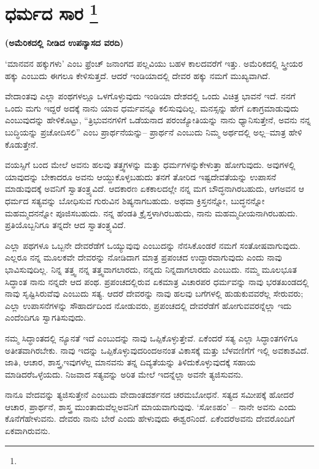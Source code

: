 
\vspace{-0.8cm}

\chapter[ಧರ್ಮದ ಸಾರ ]{ಧರ್ಮದ ಸಾರ \protect\footnote{}}

\centerline{\textbf{(ಅಮೆರಿಕದಲ್ಲಿ ನೀಡಿದ ಉಪನ್ಯಾಸದ ವರದಿ)}}

‘ಮಾನವನ ಹಕ್ಕುಗಳು’ ಎಂಬ ಫ್ರೆಂಚ್​ ಜನಾಂಗದ ಪಲ್ಲವಿಯು ಬಹಳ ಕಾಲದವರೆಗೆ ಇತ್ತು. ಅಮೆರಿಕದಲ್ಲಿ ಸ್ತ್ರೀಯರ ಹಕ್ಕು ಎಂಬುದು ಈಗಲೂ ಕೇಳಿಸುತ್ತದೆ. ಆದರೆ ಇಂಡಿಯಾದಲ್ಲಿ ದೇವರ ಹಕ್ಕು ನಮಗೆ ಮುಖ್ಯವಾಗಿದೆ.

ವೇದಾಂತವು ಎಲ್ಲಾ ಪಂಥಗಳಲ್ಲೂ ಒಳಗೊಳ್ಳುವುದು ಇಂಡಿಯಾ ದೇಶದಲ್ಲಿ ಒಂದು ವಿಚಿತ್ರ ಭಾವನೆ ಇದೆ. ನನಗೆ ಒಂದು ಮಗು ಇದ್ದರೆ ಅದಕ್ಕೆ ನಾನು ಯಾವ ಧರ್ಮವನ್ನೂ ಕಲಿಸುವುದಿಲ್ಲ. ಮನಸ್ಸನ್ನು ಹೇಗೆ ಏಕಾಗ್ರಮಾಡುವುದು ಎಂಬುವುದನ್ನು ಹೇಳಿಕೊಟ್ಟು, “ತ್ರಿಭುವನಗಳಿಗೆ ಒಡೆಯನಾದ ಪರಂಜ್ಯೋತಿಯನ್ನು ನಾನು ಧ್ಯಾನಿಸುತ್ತೇನೆ, ಅವನು ನನ್ನ ಬುದ್ಧಿಯನ್ನು ಪ್ರಚೋದಿಸಲಿ” ಎಂಬ ಪ್ರಾರ್ಥನೆಯನ್ನು– ಪ್ರಾರ್ಥನೆ ಎಂಬುದು ನಿಮ್ಮ ಅರ್ಥದಲ್ಲಿ ಅಲ್ಲ–ಮಾತ್ರ ಹೇಳಿ ಕೊಡುತ್ತೇನೆ.

ವಯಸ್ಸಿಗೆ ಬಂದ ಮೇಲೆ ಅವನು ಹಲವು ತತ್ತ್ವಗಳನ್ನು ಮತ್ತು ಧರ್ಮಗಳನ್ನು\break ಕೇಳುತ್ತಾ ಹೋಗುವುದು. ಅವುಗಳಲ್ಲಿ ಯಾವುದನ್ನು ಬೇಕಾದರೂ ಅವನು ಆಯ್ದುಕೊಳ್ಳ\-ಬಹುದು ತನಗೆ ತೋರಿದ ಇಷ್ಟದೇವತೆಯನ್ನು ಉಪಾಸನೆ ಮಾಡುವುದಕ್ಕೆ ಅವನಿಗೆ ಸ್ವಾತಂತ್ರ್ಯವಿದೆ. ಆದಕಾರಣ ಏಕಕಾಲದಲ್ಲೇ ನನ್ನ ಮಗ ಬೌದ್ಧನಾಗಿರಬಹುದು, ಆಗ\break ಅವನ ಆ ಧರ್ಮದ ಸತ್ಯವನ್ನು ಬೋಧಿಸುವ ಗುರುವಿನ ಶಿಷ್ಯನಾಗಬಹುದು. ಅಥವಾ ಕ್ರಿಸ್ತನನ್ನೋ, ಬುದ್ಧನನ್ನೋ ಮಹಮ್ಮದನನ್ನೋ ಪೂಜಿಸಬಹುದು. ನನ್ನ ಹೆಂಡತಿ ಕ್ರೈಸ್ತಳಾಗಿರ\break ಬಹುದು, ನಾನು ಮಹಮ್ಮದೀಯನಾಗಿರಬಹುದು. ಪ್ರತಿಯೊಬ್ಬನಿಗೂ ತನ್ನದೇ ಆದ ಸ್ವಾತಂತ್ರ್ಯವಿದೆ.

ಎಲ್ಲಾ ಪಥಗಳೂ ಒಬ್ಬನೇ ದೇವರೆಡೆಗೆ ಒಯ್ಯುವುವು ಎಂಬುದನ್ನು ನೆನಸಿಕೊಂಡರೆ ನಮಗೆ ಸಂತೋಷವಾಗುವುದು. ಎಲ್ಲರೂ ನನ್ನ ಮೂಲಕವೇ ದೇವರನ್ನು ನೋಡಿದಾಗ ಮಾತ್ರ ಪ್ರಪಂಚದ ಉದ್ಧಾರವಾಗುವುದು ಎಂದು ನಾವು ಭಾವಿಸುವುದಿಲ್ಲ. ನಿನ್ನ ತತ್ತ್ವ ನನ್ನ ತತ್ತ್ವವಾಗಲಾರದು, ನನ್ನದು ನಿನ್ನದಾಗಲಾರದು ಎಂಬುದು. ನಮ್ಮ ಮೂಲಭೂತ ಸಿದ್ಧಾಂತ ನಾನು ನನ್ನದೇ ಆದ ಪಂಥ. ಪ್ರಪಂಚದಲ್ಲಿರುವ ಏಕಮಾತ್ರ ವಿಚಾರಪರ ಧರ್ಮವನ್ನು ನಾವು ಭರತಖಂಡದಲ್ಲಿ ನಾವು ಸೃಷ್ಟಿಸಿರುವೆವು ಎಂಬುದು ಸತ್ಯ. ಆದರೆ ದೇವರನ್ನು ನಾವು ಹಲವು ಬಗೆಗಳಲ್ಲಿ ಹುಡುಕುವವರೆಲ್ಲ ಸೇರುವರು; ಎಲ್ಲಾ ಉಪಾಸನೆಗಳನ್ನು ಸೌಹಾರ್ದದಿಂದ ನೋಡುವರು, ಪ್ರಪಂಚದಲ್ಲಿ ದೇವರೆಡೆಗೆ ಹೋಗುವವರನ್ನೆಲ್ಲಾ ಇದು ಎಂದೆಂದಿಗೂ ಸ್ವಾಗತಿಸುವುದು.

ನಮ್ಮ ಸಿದ್ಧಾಂತದಲ್ಲಿ ನ್ಯೂನತೆ ಇದೆ ಎಂಬುದನ್ನು ನಾವು ಒಪ್ಪಿಕೊಳ್ಳುತ್ತೇವೆ. ಏಕೆಂದರೆ ಸತ್ಯ ಎಲ್ಲಾ ಸಿದ್ಧಾಂತಗಳಿಗೂ ಅತೀತವಾಗಿರಬೇಕು. ನಾವು ಇದನ್ನು ಒಪ್ಪಿಕೊಳ್ಳುವುದರಿಂದ\break ಅನಂತ ವಿಕಾಸಕ್ಕೆ ಮತ್ತು ಬೆಳವಣಿಗೆಗೆ ಇಲ್ಲಿ ಅವಕಾಶವಿದೆ. ಜಾತಿ, ಆಚಾರ, ಶಾಸ್ತ್ರ,\break ಇವುಗಳೆಲ್ಲ ಮಾನವನು ತನ್ನ ದಿವ್ಯತೆಯನ್ನು ತಿಳಿದುಕೊಳ್ಳುವುದಕ್ಕೆ ಸಹಾಯ ಮಾಡಿದರೆ\break ಒಳ್ಳೆಯದು. ನಿಜವಾದ ಸತ್ಯವನ್ನು ಅರಿತ ಮೇಲೆ ಇದನ್ನೆಲ್ಲಾ ಅವನೇ ತ್ಯಜಿಸುವನು.

ನಾನೂ ವೇದವನ್ನು ತ್ಯಜಿಸುತ್ತೇನೆ ಎಂಬುದು ವೇದಾಂತದರ್ಶನದ ಚರಮ\break ಬೋಧನೆ. ಸತ್ಯದ ಸಮೀಪಕ್ಕೆ ಹೋದರೆ ಆಚಾರ, ಪ್ರಾರ್ಥನೆ, ಶಾಸ್ತ್ರ ಮುಂತಾದುವೆಲ್ಲ\break ಅವನಿಗೆ ಮಾಯವಾಗುವುವು. ‘ಸೋಽಹಂ’ – ನಾನೇ ಅವನು ಎಂದು ಕೊನೆಗೆ\break ಹೇಳುವನು. ದೇವರು ನಾನು ಬೇರೆ ಎಂದು ಹೇಳುವುದು ಈಶ್ವರನಿಂದೆ. ಏಕೆಂದರೆ\break ಅವನು ದೇವರೊಂದಿಗೆ ಏಕವಾಗಿರುವನು.


